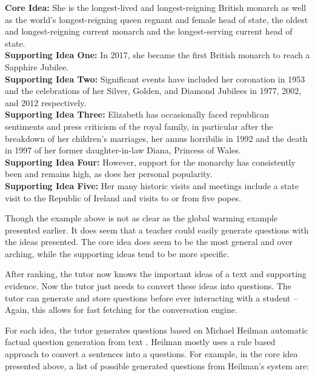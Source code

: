 \documentclass{sigchi}
\begin{document}
  \begin{addmargin}[1em]{2em}
    \textbf{Core Idea:} She is the longest-lived and longest-reigning British monarch as well as the world's longest-reigning queen regnant and female head of state, the oldest and longest-reigning current monarch and the longest-serving current head of state. \\
    \textbf{Supporting Idea One:} In 2017, she became the first British monarch to reach a Sapphire Jubilee. \\
    \textbf{Supporting Idea Two:} Significant events have included her coronation in 1953 and the celebrations of her Silver, Golden, and Diamond Jubilees in 1977, 2002, and 2012 respectively. \\
    \textbf{Supporting Idea Three:} Elizabeth has occasionally faced republican sentiments and press criticism of the royal family, in particular after the breakdown of her children's marriages, her annus horribilis in 1992 and the death in 1997 of her former daughter-in-law Diana, Princess of Wales. \\
    \textbf{Supporting Idea Four:} However, support for the monarchy has consistently been and remains high, as does her personal popularity. \\
    \textbf{Supporting Idea Five:} Her many historic visits and meetings include a state visit to the Republic of Ireland and visits to or from five popes. \\
  \end{addmargin}

  Though the example above is not as clear as the global warming example presented earlier. It does seem that a teacher could easily generate questions with the ideas presented. The core idea does seem to be the most general and over arching, while the supporting ideas tend to be more specific.

  After ranking, the tutor now knows the important ideas of a text and supporting evidence. Now the tutor just needs to convert these ideas into questions. The tutor can generate and store questions before ever interacting with a student -- Again, this allows for fast fetching for the conversation engine.

  For each idea, the tutor generates questions based on Michael Heilman automatic factual question generation from text \cite{Heilman}. Heilman mostly uses a rule based approach to convert a sentences into a questions. For example, in the core idea presented above, a list of possible generated questions from Heilman's system are:
\end{document}

